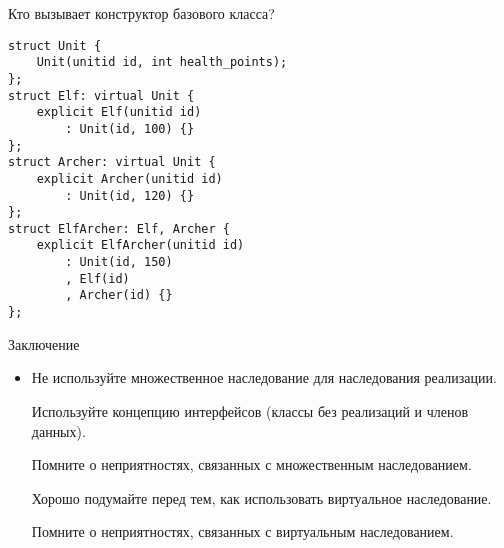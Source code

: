 \documentclass[aspectration=1610,t]{beamer}
\begin{document}
\begin{frame}[fragile]{Кто вызывает конструктор базового класса?}
\begin{minipage}{.7\textwidth}
    \begin{lstlisting}
struct Unit { 
    Unit(unitid id, int health_points); 
};
struct Elf: virtual Unit {
    explicit Elf(unitid id) 
        : Unit(id, 100) {}
};
struct Archer: virtual Unit {
    explicit Archer(unitid id) 
        : Unit(id, 120) {}
};
struct ElfArcher: Elf, Archer {
    explicit ElfArcher(unitid id) 
        : Unit(id, 150)
        , Elf(id)
        , Archer(id) {}
};
    \end{lstlisting}
\end{minipage}
\begin{minipage}{.25\textwidth}
\end{minipage}

\end{frame}

\begin{frame}[fragile]{Заключение}
    \begin{itemize}
        \item Не используйте множественное наследование для наследования
            реализации.
        
        \pitem Используйте концепцию интерфейсов (классы без реализаций и членов данных).

        \pitem Помните о неприятностях, связанных с множественным наследованием.

        \pitem Хорошо подумайте перед тем, как использовать виртуальное
            наследование.

        \pitem Помните о неприятностях, связанных с виртуальным наследованием.
    \end{itemize}
\end{frame}
\end{document}
